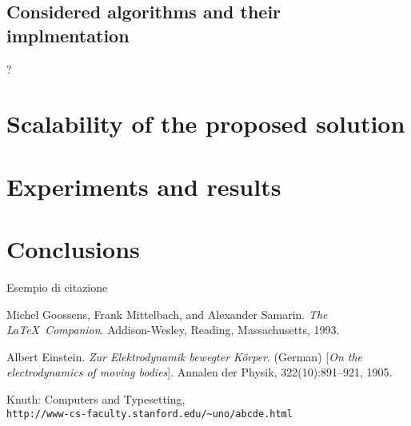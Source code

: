 \documentclass[a4paper,12pt]{article}
\begin{document}
\newpage
\subsection{Considered algorithms and their implmentation}
?

\newpage
\section{Scalability of the proposed solution}

\newpage
\section{Experiments and results}

\newpage
\section{Conclusions}
Esempio di citazione\cite{latexcompanion}

\newpage
{}
\begin{thebibliography}{9}
Michel Goossens, Frank Mittelbach, and Alexander Samarin. 
\textit{The \LaTeX\ Companion}. 
Addison-Wesley, Reading, Massachusetts, 1993.

Albert Einstein. 
\textit{Zur Elektrodynamik bewegter K{\"o}rper}. (German) 
[\textit{On the electrodynamics of moving bodies}]. 
Annalen der Physik, 322(10):891–921, 1905.

Knuth: Computers and Typesetting,
\\\texttt{http://www-cs-faculty.stanford.edu/\~{}uno/abcde.html}
\end{thebibliography}
\end{document}

